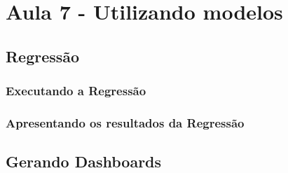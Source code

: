 
\chapter{Aula 7 - Utilizando modelos}

\section{Regressão}

\subsection{Executando a Regressão}

\subsection{Apresentando os resultados da Regressão}

\section{Gerando Dashboards}
